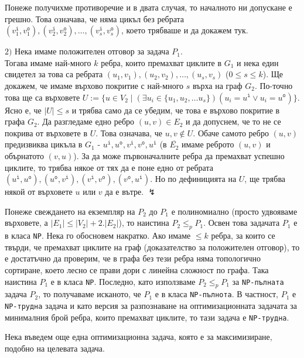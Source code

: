 \documentclass[12pt,twoside,a4paper]{article}
\begin{document}
\begin{theorem}
		Понеже получихме противоречие и в двата случая, то началното ни допускане е грешно. Това означава, че няма цикъл без ребрата $(v_1^\texttt{i}, v_1^\texttt{o}), (v_2^\texttt{i}, v_2^\texttt{o}), \dots, (v_s^\texttt{i}, v_s^\texttt{o})$, което трябваше и да докажем тук.
		
		$2)$ Нека имаме положителен отговор за задача $P_1$.\\
		Тогава имаме най-много $k$ ребра, които премахват циклите в $G_1$ и нека един свидетел за това са ребрата $(u_1, v_1), (u_2, v_2), \dots, (u_s, v_s)$ ($0 \le s \le k$). Ще докажем, че имаме върхово покритие с най-много $s$ върха на граф $G_2$. По-точно това ще са върховете $U := \{u \in V_2 \mid (\exists u_i \in \{u_1, u_2, \dots u_s\})(u_i = u^\texttt{i} \lor u_i = u^\texttt{o})\}$. Ясно е, че $|U| \le s$ и трябва само да се убедим, че това е върхово покритие в графа $G_2$. Да разгледаме едно ребро $(u,v) \in E_2$ и да допуснем, че то не се покрива от върховете в $U$. Това означава, че $u, v \notin U$. Обаче самото ребро $(u,v)$ предизвиква цикъла в $G_1$ - $u^\texttt{i}, u^\texttt{o}, v^\texttt{i}, v^\texttt{o}, u^\texttt{i}$ (в $\overline{E_2}$ имаме реброто $(u,v)$ и обърнатото $(v,u)$). За да може първоначалните ребра да премахват успешно циклите, то трябва някое от тях да е поне едно от ребрата $(u^\texttt{i}, u^\texttt{o}), (u^\texttt{o}, v^\texttt{i}), (v^\texttt{i}, v^\texttt{o}), (v^\texttt{o}, u^\texttt{i})$. Но по дефиницията на $U$, ще трябва някой от върховете $u$ или $v$ да е вътре. $\lightning$
		
		Понеже свеждането на екземпляр на $P_2$ до $P_1$ е полиномиално (просто удвояваме върховете, а $|E_1| \le |V_2|+2.|E_2|$), то наистина $P_2 \le_p P_1$. Освен това задачата $P_1$ е в класа \texttt{NP}. Нека го обосновем накратко. Ако имаме $\le k$ ребра, за които се твърди, че премахват циклите на граф (доказателство за положителен отговор), то е достатъчно да проверим, че в графа без тези ребра няма топологично сортиране, което лесно се прави дори с линейна сложност по графа. Така наистина $P_1$ е в класа \texttt{NP}. Последно, като използваме $P_2 \le_p P_1$ за \texttt{NP-пълната} задача $P_2$, то получаваме исканото, че $P_1$ е в класа \texttt{NP-пълнота}. В частност, $P_1$ е \texttt{NP-трудна} задача и като версия за разпознаване на оптимизационната задачата за минималния брой ребра, които премахват циклите, то тази задача е \texttt{NP-трудна}.
	\end{theorem}
	
	Нека въведем още една оптимизационна задача, която е за максимизиране, подобно на целевата задача.
	
\end{document}
